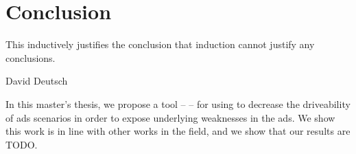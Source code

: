 \chapter{Conclusion}\label{sec:conclusion}

\epigraph{This inductively justifies the conclusion that induction cannot justify any conclusions.}{David Deutsch}

In this master's thesis, we propose a tool -- \hefe -- for using  to decrease the
driveability of \acrfull{ads} scenarios in order to expose underlying weaknesses in the
\acrshort{ads}. We show this work is in line with other works in the field, and we show that our
results are TODO.
